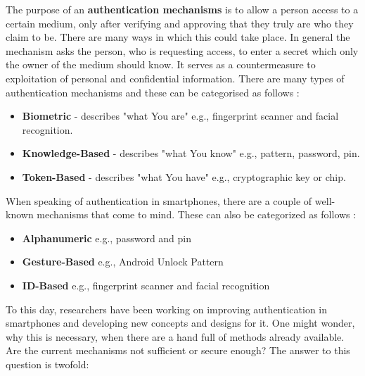The purpose of an \textbf{authentication mechanisms} is to allow a person access to a certain medium, only after verifying and approving that they truly are who they claim to be. There are many ways in which this could take place. In general the mechanism asks the person, who is requesting access, to enter a secret which only the owner of the medium should know. It serves as a countermeasure to exploitation of personal and confidential information. There are many types of authentication mechanisms and these can be categorised as follows \cite{gorman}:  
\begin{itemize}
    \item \textbf{Biometric} - describes "what You are" e.g., fingerprint scanner and facial recognition.
    \item \textbf{Knowledge-Based} - describes "what You know" e.g., pattern, password, pin.
    \item \textbf{Token-Based} - describes "what You have" e.g., cryptographic key or chip.
\end{itemize}


When speaking of authentication in smartphones, there are a couple of well-known mechanisms that come to mind. These can also be categorized as follows \cite{ediss20251,gorman} : 
\begin{itemize}
    \item \textbf{Alphanumeric} e.g., password and pin
    \item \textbf{Gesture-Based} e.g., Android Unlock Pattern
    \item \textbf{ID-Based} e.g., fingerprint scanner and facial recognition 
\end{itemize}

To this day, researchers have been working on improving authentication in smartphones and developing new concepts and designs for it. One might wonder, why this is necessary, when there are a hand full of methods already available. Are the current mechanisms not sufficient or secure enough? The answer to this question is twofold:\\


